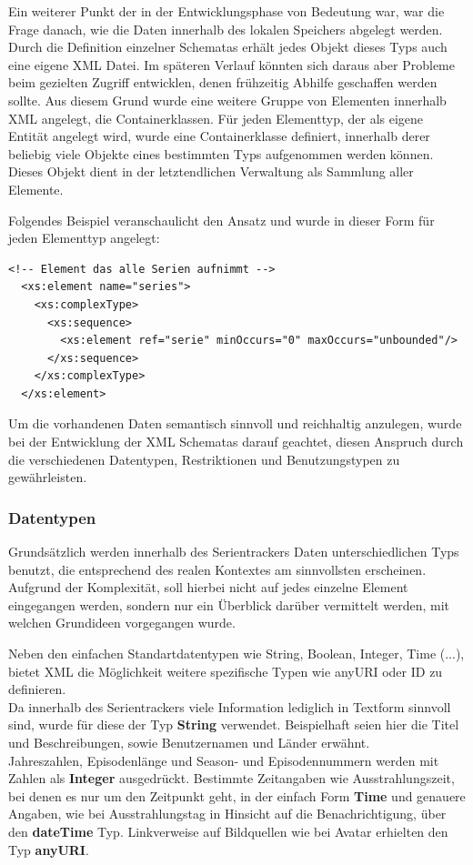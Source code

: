 \documentclass[a4paper]{article}
\begin{document}
Ein weiterer Punkt der in der Entwicklungsphase von Bedeutung war, war die Frage danach, wie die Daten innerhalb des lokalen Speichers abgelegt werden.
Durch die Definition einzelner Schematas erhält jedes Objekt dieses Typs auch eine eigene XML Datei. Im späteren Verlauf könnten sich daraus aber Probleme beim gezielten Zugriff entwicklen, denen frühzeitig Abhilfe geschaffen werden sollte.
Aus diesem Grund wurde eine weitere Gruppe von Elementen innerhalb XML angelegt, die Containerklassen. 
Für jeden Elementtyp, der als eigene Entität angelegt wird, wurde eine Containerklasse definiert, innerhalb derer beliebig viele Objekte eines bestimmten Typs aufgenommen werden können. Dieses Objekt dient in der letztendlichen Verwaltung als Sammlung aller Elemente.

Folgendes Beispiel veranschaulicht den Ansatz und wurde in dieser Form für jeden Elementtyp angelegt:


\begin{lstlisting}[label=xsd-definition,caption= Auszug aus der Series.xsd Definition]
<!-- Element das alle Serien aufnimmt -->
  <xs:element name="series">
    <xs:complexType>
      <xs:sequence>
        <xs:element ref="serie" minOccurs="0" maxOccurs="unbounded"/>
      </xs:sequence>
    </xs:complexType>
  </xs:element>
\end{lstlisting}


Um die vorhandenen Daten semantisch sinnvoll und reichhaltig anzulegen, wurde bei der Entwicklung der XML Schematas darauf geachtet, diesen Anspruch 
durch die verschiedenen Datentypen, Restriktionen und Benutzungstypen zu gewährleisten. 

\newpage

\subsubsection{Datentypen}
Grundsätzlich werden innerhalb des Serientrackers Daten unterschiedlichen Typs benutzt, die entsprechend des realen Kontextes am sinnvollsten erscheinen.
Aufgrund der Komplexität, soll hierbei nicht auf jedes einzelne Element eingegangen werden, sondern nur ein Überblick darüber vermittelt werden, mit welchen Grundideen vorgegangen wurde.

Neben den einfachen Standartdatentypen wie String, Boolean, Integer, Time (...), bietet XML die Möglichkeit weitere spezifische Typen wie anyURI oder ID zu definieren.\\ 
Da innerhalb des Serientrackers viele Information lediglich in Textform sinnvoll sind, wurde für diese der Typ \textbf{String} verwendet. Beispielhaft seien hier die Titel und Beschreibungen, sowie Benutzernamen und Länder erwähnt.\\ 
Jahreszahlen, Episodenlänge und Season- und Episodennummern werden mit Zahlen als \textbf{Integer} ausgedrückt. Bestimmte Zeitangaben wie Ausstrahlungszeit, bei denen es nur um den Zeitpunkt geht, in der einfach Form \textbf{Time} und genauere Angaben, wie bei Ausstrahlungstag in Hinsicht auf die Benachrichtigung, über den \textbf{dateTime} Typ. 
Linkverweise auf Bildquellen wie bei Avatar erhielten den Typ \textbf{anyURI}.\\
\end{document}
